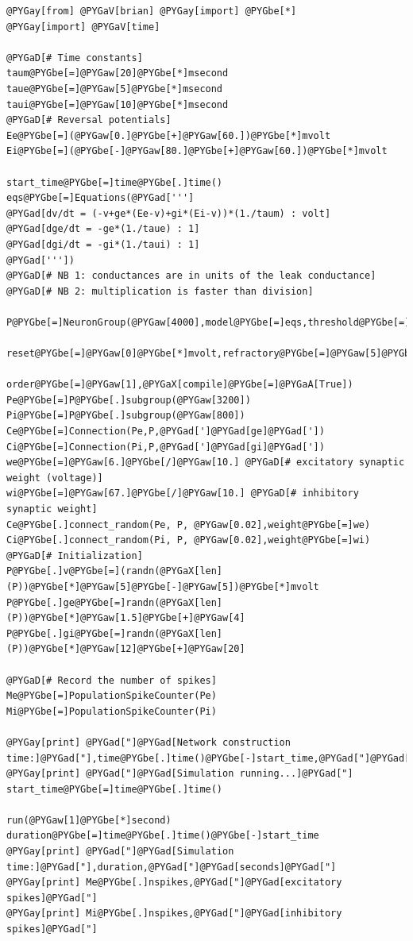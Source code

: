 \documentclass[letterpaper,10pt]{manual}
\begin{document}
\begin{Verbatim}[commandchars=@\[\]]
@PYGay[from] @PYGaV[brian] @PYGay[import] @PYGbe[*]
@PYGay[import] @PYGaV[time]

@PYGaD[# Time constants]
taum@PYGbe[=]@PYGaw[20]@PYGbe[*]msecond
taue@PYGbe[=]@PYGaw[5]@PYGbe[*]msecond
taui@PYGbe[=]@PYGaw[10]@PYGbe[*]msecond
@PYGaD[# Reversal potentials]
Ee@PYGbe[=](@PYGaw[0.]@PYGbe[+]@PYGaw[60.])@PYGbe[*]mvolt
Ei@PYGbe[=](@PYGbe[-]@PYGaw[80.]@PYGbe[+]@PYGaw[60.])@PYGbe[*]mvolt

start_time@PYGbe[=]time@PYGbe[.]time()
eqs@PYGbe[=]Equations(@PYGad[''']
@PYGad[dv/dt = (-v+ge*(Ee-v)+gi*(Ei-v))*(1./taum) : volt]
@PYGad[dge/dt = -ge*(1./taue) : 1]
@PYGad[dgi/dt = -gi*(1./taui) : 1]
@PYGad['''])
@PYGaD[# NB 1: conductances are in units of the leak conductance]
@PYGaD[# NB 2: multiplication is faster than division]

P@PYGbe[=]NeuronGroup(@PYGaw[4000],model@PYGbe[=]eqs,threshold@PYGbe[=]@PYGaw[10]@PYGbe[*]mvolt,\
              reset@PYGbe[=]@PYGaw[0]@PYGbe[*]mvolt,refractory@PYGbe[=]@PYGaw[5]@PYGbe[*]msecond,
              order@PYGbe[=]@PYGaw[1],@PYGaX[compile]@PYGbe[=]@PYGaA[True])
Pe@PYGbe[=]P@PYGbe[.]subgroup(@PYGaw[3200])
Pi@PYGbe[=]P@PYGbe[.]subgroup(@PYGaw[800])
Ce@PYGbe[=]Connection(Pe,P,@PYGad[']@PYGad[ge]@PYGad['])
Ci@PYGbe[=]Connection(Pi,P,@PYGad[']@PYGad[gi]@PYGad['])
we@PYGbe[=]@PYGaw[6.]@PYGbe[/]@PYGaw[10.] @PYGaD[# excitatory synaptic weight (voltage)]
wi@PYGbe[=]@PYGaw[67.]@PYGbe[/]@PYGaw[10.] @PYGaD[# inhibitory synaptic weight]
Ce@PYGbe[.]connect_random(Pe, P, @PYGaw[0.02],weight@PYGbe[=]we)
Ci@PYGbe[.]connect_random(Pi, P, @PYGaw[0.02],weight@PYGbe[=]wi)
@PYGaD[# Initialization]
P@PYGbe[.]v@PYGbe[=](randn(@PYGaX[len](P))@PYGbe[*]@PYGaw[5]@PYGbe[-]@PYGaw[5])@PYGbe[*]mvolt
P@PYGbe[.]ge@PYGbe[=]randn(@PYGaX[len](P))@PYGbe[*]@PYGaw[1.5]@PYGbe[+]@PYGaw[4]
P@PYGbe[.]gi@PYGbe[=]randn(@PYGaX[len](P))@PYGbe[*]@PYGaw[12]@PYGbe[+]@PYGaw[20]

@PYGaD[# Record the number of spikes]
Me@PYGbe[=]PopulationSpikeCounter(Pe)
Mi@PYGbe[=]PopulationSpikeCounter(Pi)

@PYGay[print] @PYGad["]@PYGad[Network construction time:]@PYGad["],time@PYGbe[.]time()@PYGbe[-]start_time,@PYGad["]@PYGad[seconds]@PYGad["]
@PYGay[print] @PYGad["]@PYGad[Simulation running...]@PYGad["]
start_time@PYGbe[=]time@PYGbe[.]time()

run(@PYGaw[1]@PYGbe[*]second)
duration@PYGbe[=]time@PYGbe[.]time()@PYGbe[-]start_time
@PYGay[print] @PYGad["]@PYGad[Simulation time:]@PYGad["],duration,@PYGad["]@PYGad[seconds]@PYGad["]
@PYGay[print] Me@PYGbe[.]nspikes,@PYGad["]@PYGad[excitatory spikes]@PYGad["]
@PYGay[print] Mi@PYGbe[.]nspikes,@PYGad["]@PYGad[inhibitory spikes]@PYGad["]
\end{Verbatim}
\end{document}
